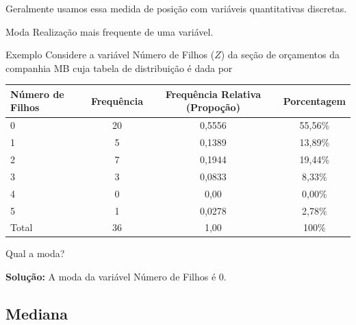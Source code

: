 \documentclass[8pt]{beamer}
\begin{document}
\begin{frame}{}
 Geralmente usamos essa medida de posição com variáveis quantitativas discretas.
 \begin{block}{Moda}
  Realização mais frequente de uma variável.
 \end{block}

 \begin{block}{Exemplo}
 Considere a variável Número de Filhos ($Z$) da seção de orçamentos da companhia MB cuja tabela de distribuição é dada por

  {\tiny
 \begin{table}
  \centering
  \begin{tabular}{l|ccc}
    \toprule[0.05cm]
    Número de Filhos & Frequência & Frequência Relativa (Propoção) & Porcentagem\\
    \midrule[0.05cm]
    0 & 20 & 0,5556 & 55,56\% \\
    1 & 5 & 0,1389 & 13,89\% \\
    2 & 7 & 0,1944 & 19,44\% \\
    3 & 3 & 0,0833 & 8,33\% \\
    4 & 0 & 0,00 & 0,00\% \\
    5 & 1 & 0,0278 & 2,78\% \\ \midrule[0,05cm]
    Total & 36 & 1,00 & 100\% \\ \bottomrule[0,05cm]
  \end{tabular}
 \end{table}
 }
 
 Qual a moda?
 
 \textbf{Solução:} A moda da variável Número de Filhos é 0.
 \end{block}
\end{frame}

\subsection{Mediana}
\end{document}
